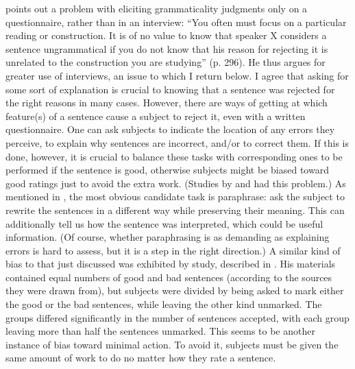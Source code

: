  \citet{Carden1970a} points out a problem with eliciting grammaticality judgments only on a questionnaire, rather than in an interview: ``You often must focus on a particular reading or construction. It is of no value to know that speaker X considers a sentence ungrammatical if you do not know that his reason for rejecting it is unrelated to the construction you are studying'' (p. 296). He thus argues for greater use of interviews, an issue to which I return below. I agree that asking for some sort of explanation is crucial to knowing that a sentence was rejected for the right reasons in many cases. However, there are ways of getting at which feature(s) of a sentence cause a subject to reject it, even with a written questionnaire. One can ask subjects to indicate the location of any errors they perceive, to explain why sentences are incorrect, and/or to correct them. If this is done, however, it is crucial to balance these tasks with corresponding ones to be performed if the sentence is good, otherwise subjects might be biased toward good ratings just to avoid the extra work. (Studies by \citet{Snow1975} and \citet{Hakes1980} had this problem.) As mentioned in , the most obvious candidate task is paraphrase: ask the subject to rewrite the sentences in a different way while preserving their
 meaning. This can additionally tell us how the sentence was interpreted, which could be useful information. (Of course, whether paraphrasing is as demanding as explaining errors is hard to assess, but it is a step in the right direction.) A similar kind of bias to that just discussed was exhibited by  study, described in . His materials contained equal numbers of good and bad sentences (according to the sources they were drawn from), but subjects were divided by being asked to mark either the good or the bad sentences, while leaving the other kind unmarked. The groups differed significantly in the number of sentences accepted, with each group leaving more than half the sentences unmarked. This seems to be another instance of bias toward minimal action. To avoid it, subjects must be given the same amount of work to do no matter how they rate a sentence.

